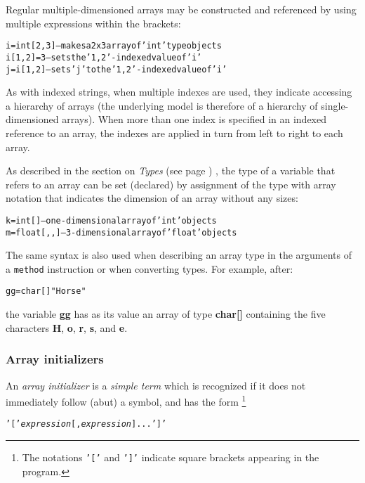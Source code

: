 Regular multiple-dimensioned arrays may be constructed and referenced by
using multiple expressions within the brackets:
\begin{alltt}
i=int[2,3] -- makes a 2x3 array of 'int' type objects
i[1,2]=3   -- sets the '1,2'-indexed value of 'i'
j=i[1,2]   -- sets 'j' to the '1,2'-indexed value of 'i'
\end{alltt}
 As with indexed strings, when multiple indexes are used, they
indicate accessing a hierarchy of arrays (the underlying model is
therefore of a hierarchy of single-dimensioned arrays).
When more than one index is specified in an indexed reference to an
array, the indexes are applied in turn from left to right to each
array.
 
As described in the section on  \emph{Types} (see page \pageref{reftypes}) , the
type of a variable that refers to an array can be set (declared) by
assignment of the type with array notation that indicates the dimension
of an array without any sizes:
\begin{alltt}
k=int[]     -- one-dimensional array of 'int' objects
m=float[,,] -- 3-dimensional array of 'float' objects
\end{alltt}

The same syntax is also used when describing an array type in the
arguments of a \texttt{method} instruction or when converting types.
For example, after:
\begin{alltt}
gg=char[] "Horse"
\end{alltt}
the variable \textbf{gg} has as its value an array of
type \textbf{char[]} containing the five
characters \textbf{H}, \textbf{o}, \textbf{r}, \textbf{s},
and \textbf{e}.
\subsubsection{Array initializers}\label{refarrin}
 
An \emph{array initializer} is a \emph{simple term} which is
recognized if it does not immediately follow (abut) a symbol, and has
the form
\footnote{
The notations \texttt{'['} and \texttt{']'}
indicate square brackets appearing in the \nr{} program.
}
\begin{alltt}
\texttt{'['}\emph{expression}[,\emph{expression}]...\texttt{']'}
\end{alltt}
 
